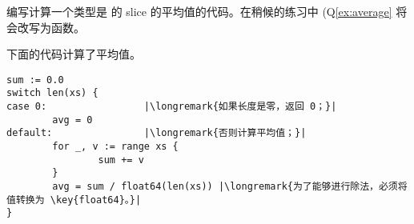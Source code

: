 \begin{Exercise}[title={Average},difficulty=4]
\label{ex:average no func}
\Question\label{ex:average no func q1} 编写计算一个类型是
 的 slice 的平均值的代码。在稍候的练习中 (Q\ref{ex:average} 
将会改写为函数。
\end{Exercise}

\begin{Answer}
\Question 下面的代码计算了平均值。
\begin{lstlisting}
sum := 0.0 
switch len(xs) {
case 0:                 |\longremark{如果长度是零，返回 0；}|
        avg = 0
default:                |\longremark{否则计算平均值；}|
        for _, v := range xs {
                sum += v
        }
        avg = sum / float64(len(xs)) |\longremark{为了能够进行除法，必须将值转换为 \key{float64}。}|
}
\end{lstlisting}
\showremarks
\end{Answer}
